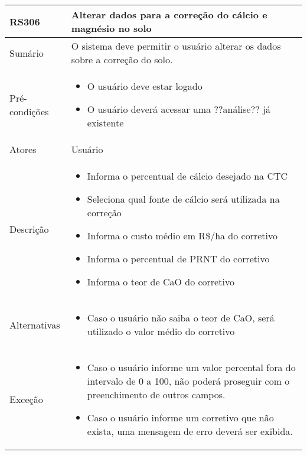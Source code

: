 \begin{quadro}[H]
    \begin{tabular}{|p{3cm}|p{11cm}|}
        \hline
        \textbf{RS306} & \textbf{Alterar dados para a correção do cálcio e magnésio no solo}          \\
        \hline
        Sumário        & O sistema deve permitir o usuário alterar os dados sobre a correção do solo. \\
        \hline
        Pré-condições  & \begin{itemize}
            \item O usuário deve estar logado
            \item O usuário deverá acessar uma ??análise?? já existente
        \end{itemize}                                                   \\
        \hline
        Atores         & Usuário                                                                      \\
        \hline
        Descrição      &
        \begin{itemize}
            \item Informa o percentual de cálcio desejado na CTC
            \item Seleciona qual fonte de cálcio será utilizada na correção
            \item Informa o custo médio em R\$/ha do corretivo
            \item Informa o percentual de PRNT do corretivo
            \item Informa o teor de CaO do corretivo
        \end{itemize}                                                                    \\
        \hline
        Alternativas   &
        \begin{itemize}
            \item Caso o usuário não saiba o teor de CaO, será utilizado o valor médio do corretivo
        \end{itemize}                                                                    \\
        \hline
        Exceção        &
        \begin{itemize}
            \item Caso o usuário informe um valor percental fora do intervalo de 0 a 100, não poderá proseguir com o preenchimento de outros campos.
            \item Caso o usuário informe um corretivo que não exista, uma mensagem de erro deverá ser exibida.
        \end{itemize}                                                                    \\
        \hline
    \end{tabular}
\end{quadro}

